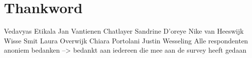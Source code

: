 \chapter*{Thankword\hfill} 
\label{ch:thankword}

Vedavyas Etikala
Jan Vantienen
Chatlayer
Sandrine D'oreye
Nike van Heeswijk
Wisse Smit
Laura Overwijk
Chiara Portolani
Justin Wesseling
Alle respondenten anoniem bedanken --> bedankt aan iedereen die mee aan de survey heeft gedaan